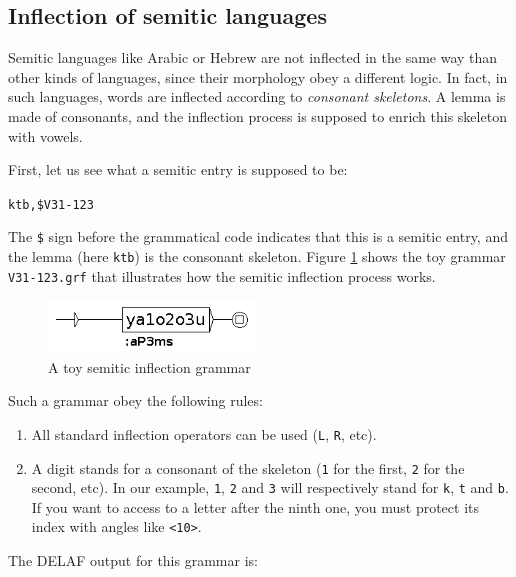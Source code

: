 \subsection{Inflection of semitic languages}
\label{subsection-semitic-inflection}
Semitic languages like Arabic or Hebrew are not inflected in the same way than 
other kinds of languages, since their morphology obey a different logic. In
fact, in such languages, words are inflected according to \textit{consonant
skeletons}. A lemma is made of consonants, and the
inflection process is supposed to enrich this skeleton with vowels.

\bigskip
\noindent First, let us see what a semitic entry is supposed to be:

\bigskip
\noindent \verb+ktb,$V31-123+

\bigskip
\noindent The \verb+$+ sign before the grammatical code indicates that
this is a semitic entry, and the lemma (here \verb+ktb+) is the consonant
skeleton. Figure \ref{semitic-grammar} shows the toy grammar \verb+V31-123.grf+
that illustrates how the semitic inflection process works.  

\bigskip
\begin{figure}[!ht]
\begin{center}
\includegraphics[width=5.5cm]{resources/img/fig3-9a.png}
\caption{A toy semitic inflection grammar\label{semitic-grammar}}
\end{center}
\end{figure}

\bigskip
\noindent Such a grammar obey the following rules:
\begin{enumerate}
  \item All standard inflection operators can be used (\verb+L+, \verb+R+, etc).
  \item A digit stands for a consonant of the skeleton (\verb+1+ for the first,
  \verb+2+ for the second, etc). In our example, \verb+1+, \verb+2+ and
  \verb+3+ will respectively stand for \verb+k+, \verb+t+ and
  \verb+b+. If you want to access to a letter after the ninth one, you must
  protect its index with angles like \verb+<10>+.
\end{enumerate}  

\bigskip
\noindent The DELAF output for this grammar is: 
  
